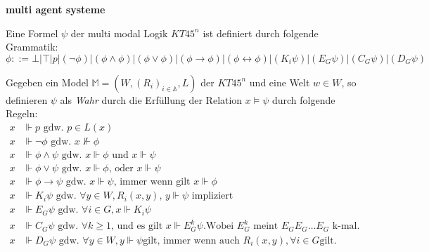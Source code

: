 \textbf{multi agent systeme}
\begin{definition}
	\label{def:bnf_kt45n}
	Eine Formel $\psi$ der multi modal Logik $KT45^n$ ist definiert durch folgende Grammatik:
	\begin{equation}
		\label{eqn:bnf_kt45n}
		\phi ::= \bot|\top|p|(\neg\phi)|(\phi\wedge\phi)|(\phi\vee\phi)|(\phi\rightarrow\phi)|
		(\phi\leftrightarrow\phi)|(K_i\psi)|(E_G\psi)|(C_G\psi)|(D_G\psi)
	\end{equation}
\end{definition}
\cite[S.335f]{huth2004logic}

\begin{definition}
		Gegeben ein Model $\mathds{M} = (W,(R_i)_{i \in \mathds{A}}, L)$ der $KT45^n$ und eine Welt $w \in W$, so definieren $\psi$ als \emph{Wahr} durch die Erfüllung der Relation $x \vDash \psi$ durch folgende Regeln:
		\begin{align}
			x &\Vdash p\text{ gdw. }p \in L(x)\\
			x &\Vdash \neg \phi\text{ gdw. }x \nVdash \phi\\
			x &\Vdash \phi \wedge \psi\text{ gdw. }x \Vdash \phi\text{ und } x \Vdash \psi\\
			x &\Vdash \phi \vee \psi\text{ gdw. }x \Vdash \phi \text{, oder } x \Vdash \psi\\
			x &\Vdash \phi \rightarrow \psi\text{ gdw. }x \Vdash \psi\text{, immer wenn gilt }x \Vdash \phi\\
			x &\Vdash K_i\psi \text{ gdw. } \forall y \in W, R_i(x,y) \text{, } y \Vdash \psi \text{ impliziert}\\
			x &\Vdash E_G\psi \text{ gdw. } \forall i \in G, x \Vdash K_i\psi\\
			x &\Vdash C_G\psi \text{ gdw. } \forall k \geq 1 \text{, und es gilt } x \Vdash E^k_G\psi \text{.} \text{Wobei } E^k_G \text{ meint } E_{G}E_{G}\dots E_{G} \text{ k-mal.}\\
			x &\Vdash D_G\psi \text{ gdw. } \forall y \in W, y \Vdash \psi \text{gilt, immer wenn auch } R_i(x,y), \forall i \in G \text{gilt.}\\
		\end{align}
\end{definition}
\cite[S.337]{huth2004logic}



























